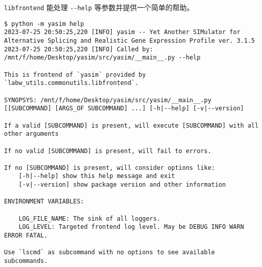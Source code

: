 \documentclass[pdf,9pt]{beamer}
\begin{document}
    \begin{frame}[fragile]{\subsubsecname}

        \Verb|libfrontend| 能处理 \Verb|--help| 等参数并提供一个简单的帮助。

        \begin{verbatim}
$ python -m yasim help
2023-07-25 20:50:25,220 [INFO] yasim -- Yet Another SIMulator for Alternative Splicing and Realistic Gene Expression Profile ver. 3.1.5
2023-07-25 20:50:25,220 [INFO] Called by: /mnt/f/home/Desktop/yasim/src/yasim/__main__.py --help

This is frontend of `yasim` provided by `labw_utils.commonutils.libfrontend`.

SYNOPSYS: /mnt/f/home/Desktop/yasim/src/yasim/__main__.py [[SUBCOMMAND] [ARGS_OF SUBCOMMAND] ...] [-h|--help] [-v|--version]

If a valid [SUBCOMMAND] is present, will execute [SUBCOMMAND] with all other arguments

If no valid [SUBCOMMAND] is present, will fail to errors.

If no [SUBCOMMAND] is present, will consider options like:
    [-h|--help] show this help message and exit
    [-v|--version] show package version and other information

ENVIRONMENT VARIABLES:

    LOG_FILE_NAME: The sink of all loggers.
    LOG_LEVEL: Targeted frontend log level. May be DEBUG INFO WARN ERROR FATAL.

Use `lscmd` as subcommand with no options to see available subcommands.
        \end{verbatim}

    \end{frame}
\end{document}
